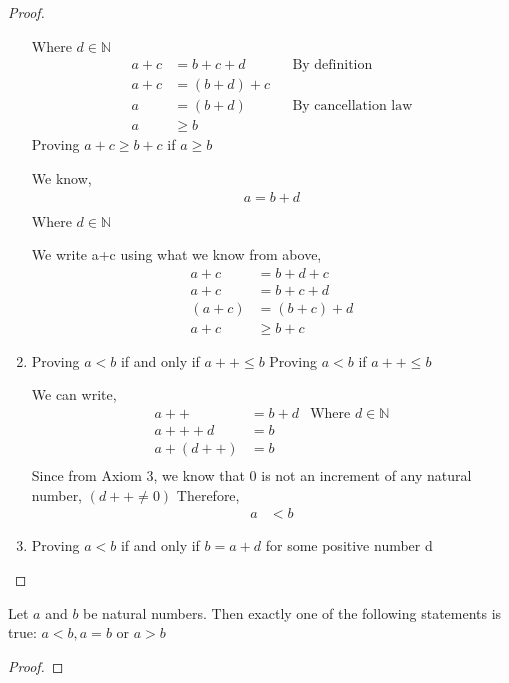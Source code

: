 \documentclass[11pt]{report}
\begin{document}
\begin{proof}
\begin{enumerate}
Where $d \in \mathbb{N}$
\begin{align*}
a + c &= b + c + d & &\text{By definition} \\
a + c &= (b+d) + c & \\
a &= (b+d) & &\text{By cancellation law}\\
a &\geq b
\end{align*}
Proving $a + c \geq b +c$ if $a \geq b$

We know,
\begin{align*}
a = b + d \\
\end{align*}
Where $d \in \mathbb{N}$

We write a+c using what we know from above,
\begin{align*}
a + c &= b + d + c \\
a + c &= b + c + d \\
(a + c) &= (b + c) + d \\
a + c &\geq b + c
\end{align*}

\item Proving $a < b$ if and only if $a++ \leq b$
Proving $a < b$ if $a++ \leq b$

We can write,
\begin{align*}
a++ &= b + d &\text{Where $d \in \mathbb{N}$} \\
a++ + d &= b  \\
a + (d++) &= b \\
\end{align*}
Since from Axiom 3, we know that 0 is not an increment of any natural number, $(d++ \neq 0)$
Therefore,
\begin{align*}
a &< b
\end{align*}
\item Proving $a < b$ if and only if $b =a+d$ for some positive number d

\end{enumerate}
\end{proof}
\begin{prop}
Let $a$ and $b$ be natural numbers. Then exactly one of the following statements is true: $a<b, a=b$ or $a>b$
\end{prop}
\begin{proof}
\end{proof}
\end{document}
